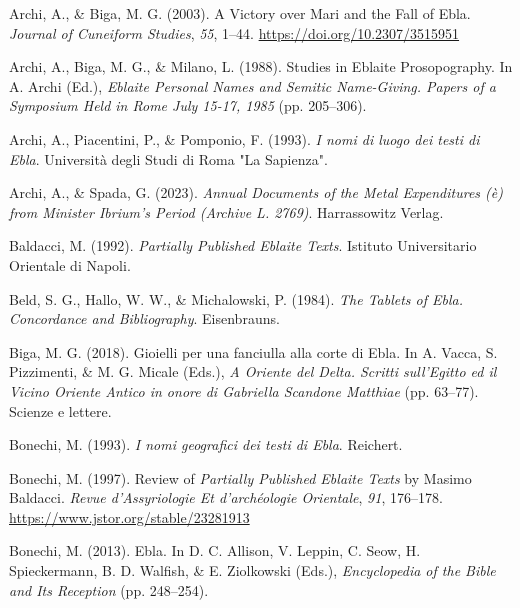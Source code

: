 \documentclass[
]{book}
\newlength{\cslhangindent}
\newlength{\cslentryspacingunit} %
\newenvironment{CSLReferences}[2] %
 {%
  \setlength{\parindent}{0pt}
  \ifodd #1
  \let\oldpar\par
  \def\par{\hangindent=\cslhangindent\oldpar}
  \fi
  \setlength{\parskip}{#2\cslentryspacingunit}
 }%
 {}
\begin{document}
\begin{CSLReferences}{1}{0}
\leavevmode{}%
Archi, A., \& Biga, M. G. (2003). A {Victory} over {Mari} and the {Fall} of {Ebla}. \emph{Journal of Cuneiform Studies}, \emph{55}, 1--44. \url{https://doi.org/10.2307/3515951}

\leavevmode{}%
Archi, A., Biga, M. G., \& Milano, L. (1988). Studies in {Eblaite Prosopography}. In A. Archi (Ed.), \emph{Eblaite {Personal Names} and {Semitic Name-Giving}. {Papers} of a {Symposium Held} in {Rome July} 15-17, 1985} (pp. 205--306).

\leavevmode{}%
Archi, A., Piacentini, P., \& Pomponio, F. (1993). \emph{I nomi di luogo dei testi di Ebla}. Università degli Studi di Roma "La Sapienza".

\leavevmode{}%
Archi, A., \& Spada, G. (2023). \emph{Annual {Documents} of the {Metal Expenditures} (è) from {Minister Ibrium}'s {Period} ({Archive L}. 2769)}. Harrassowitz Verlag.

\leavevmode{}%
Baldacci, M. (1992). \emph{Partially {Published Eblaite Texts}}. Istituto Universitario Orientale di Napoli.

\leavevmode{}%
Beld, S. G., Hallo, W. W., \& Michalowski, P. (1984). \emph{The {Tablets} of {Ebla}. {Concordance} and {Bibliography}}. Eisenbrauns.

\leavevmode{}%
Biga, M. G. (2018). Gioielli per una fanciulla alla corte di Ebla. In A. Vacca, S. Pizzimenti, \& M. G. Micale (Eds.), \emph{A Oriente del Delta. Scritti sull'Egitto ed il Vicino Oriente Antico in onore di Gabriella Scandone Matthiae} (pp. 63--77). Scienze e lettere.

\leavevmode{}%
Bonechi, M. (1993). \emph{I nomi geografici dei testi di Ebla}. Reichert.

\leavevmode{}%
Bonechi, M. (1997). Review of {\emph{Partially Published Eblaite Texts}} by {Masimo Baldacci}. \emph{Revue d'Assyriologie Et d'archéologie Orientale}, \emph{91}, 176--178. \url{https://www.jstor.org/stable/23281913}

\leavevmode{}%
Bonechi, M. (2013). Ebla. In D. C. Allison, V. Leppin, C. Seow, H. Spieckermann, B. D. Walfish, \& E. Ziolkowski (Eds.), \emph{Encyclopedia of the {Bible} and {Its Reception}} (pp. 248--254).


\end{CSLReferences}
\end{document}
